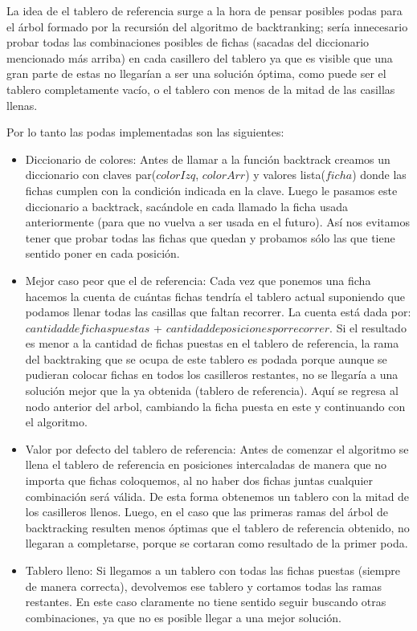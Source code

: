 La idea de el tablero de referencia surge a la hora de pensar posibles podas para el \'arbol formado por la recursi\'on del algoritmo de backtranking; ser\'ia innecesario probar todas las combinaciones posibles de fichas (sacadas del diccionario mencionado m\'as arriba) en cada casillero del tablero ya que es  visible que una gran parte de estas no llegar\'ian a ser una soluci\'on \'optima, como puede ser el tablero completamente vac\'io, o el tablero con menos de la mitad de las casillas llenas.

Por lo tanto las podas implementadas son las siguientes:

\begin{itemize}

\item Diccionario de colores: Antes de llamar a la funci\'on backtrack creamos un diccionario con claves par($colorIzq$, $colorArr$) y valores lista($ficha$) donde las fichas cumplen con la condici\'on indicada en la clave. Luego le pasamos este diccionario a backtrack, sac\'andole en cada llamado la ficha usada anteriormente (para que no vuelva a ser usada en el futuro). As\'i nos evitamos tener que probar todas las fichas que quedan y probamos s\'olo las que tiene sentido poner en cada posici\'on.

\item Mejor caso peor que el de referencia: Cada vez que ponemos una ficha hacemos la cuenta de cu\'antas fichas tendr\'ia el tablero actual suponiendo que podamos llenar todas las casillas que faltan recorrer. La cuenta est\'a dada por: $cantidad de fichas puestas$ + $cantidad de posiciones por recorrer$. Si el resultado es menor a la cantidad de fichas puestas en el tablero de referencia, la rama del backtraking que se ocupa de este tablero es podada porque aunque se pudieran colocar fichas en todos los casilleros restantes, no se llegar\'ia a una soluci\'on mejor que la ya obtenida (tablero de referencia). Aqu\'i se regresa al nodo anterior del arbol, cambiando la ficha puesta en este y continuando con el algoritmo.

\item Valor por defecto del tablero de referencia: Antes de comenzar el algoritmo se llena el tablero de referencia en posiciones intercaladas de manera que no importa que fichas coloquemos, al no haber dos fichas juntas cualquier combinaci\'on ser\'a v\'alida. De esta forma obtenemos un tablero con la mitad de los casilleros llenos. Luego, en el caso que las primeras ramas del \'arbol de backtracking resulten menos \'optimas que el tablero de referencia obtenido, no llegaran a completarse, porque se cortaran como resultado de la primer poda.

\item Tablero lleno: Si llegamos a un tablero con todas las fichas puestas (siempre de manera correcta), devolvemos ese tablero y cortamos todas las ramas restantes. En este caso claramente no tiene sentido seguir buscando otras combinaciones, ya que no es posible llegar a una mejor soluci\'on.

\end{itemize}

